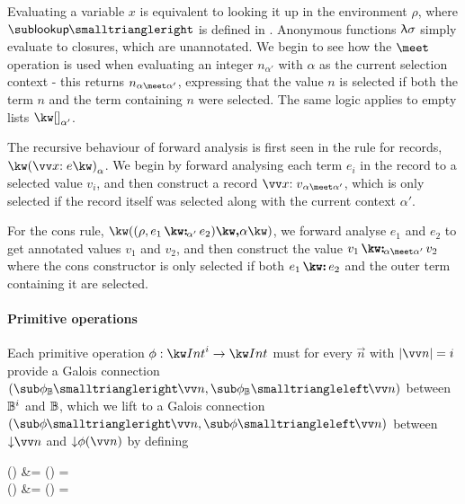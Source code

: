 Evaluating a variable $x$ is equivalent to looking it up in the environment $\rho$, where $\envLookupFwdF{}$ is defined in . Anonymous functions $\uplambda{\sigma}$ simply evaluate to closures, which are unannotated. We begin to see how the $\meet$ operation is used when evaluating an integer $n_{\alpha'}$ with $\alpha$ as the current selection context - this returns $\annot{n}{\alpha \meet \alpha'}$, expressing that the value $n$ is selected if both the term $n$ and the term containing $n$ were selected. The same logic applies to empty lists $\annot{\exNil}{\alpha'}$.

The recursive behaviour of forward analysis is first seen in the rule for records, $\exRec{\vec{\bind{x}{e}}}_{\alpha}$. We begin by forward analysing each term $e_i$ in the record to a selected value $v_i$, and then construct a record $\annot{\vec{\bind{x}{v}}}{\alpha \meet \alpha'}$, which is only selected if the record itself was selected along with the current context $\alpha'$.

For the cons rule, $\exPair{(\rho,\annCons{e_1}{e_2}{\alpha'})}{\alpha}$, we forward analyse $e_1$ and $e_2$ to get annotated values $v_1$ and $v_2$, and then construct the value $\annCons{v_1}{v_2}{\alpha \meet \alpha'}$ where the cons constructor is only selected if both $\exCons{e_1}{e_2}$ and the outer term containing it are selected.


\paragraph{Primitive operations}

Each primitive operation $\phi: \tyInt^{i} \to \tyInt$ must for every $\vec{n}$ with $\length{\vec{n}} = i$ provide a Galois connection $(\primFwdBool{\phi}{\vec{n}}, \primBwdBool{\phi}{\vec{n}})$ between $\mathbb{B}^i$ and $\mathbb{B}$, which we lift to a Galois connection $(\primFwd{\phi}{\vec{n}}, \primBwd{\phi}{\vec{n}})$ between $\Below{\vec{n}}$ and $\Below{\phi(\vec{n})}$ by defining
\begin{definition}
\label{def:core-language:primop-gc}
\begin{salign}
   () &= 
   (\vec{\alpha}) = \beta
   \\
   () &= 
   (\beta) = \vec{\alpha}
\end{salign}
\end{definition}

